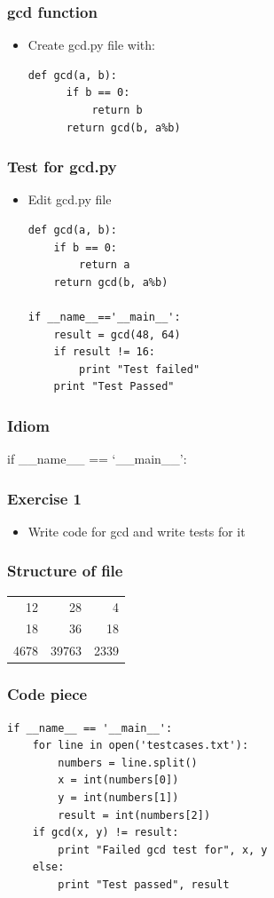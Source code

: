 \documentclass[presentation]{beamer}
\begin{document}
\begin{frame}[fragile]
\frametitle{gcd function}
\label{sec-4}


\begin{itemize}
\item Create gcd.py file with:
\lstset{language=Python}
\begin{lstlisting}
def gcd(a, b):
      if b == 0: 
          return b
      return gcd(b, a%b)
\end{lstlisting}
\end{itemize}
\end{frame}
\begin{frame}[fragile]
\frametitle{Test for gcd.py}
\label{sec-5}


\begin{itemize}
\item Edit gcd.py file
\lstset{language=Python}
\begin{lstlisting}
def gcd(a, b):
    if b == 0:
        return a
    return gcd(b, a%b)

if __name__=='__main__':
    result = gcd(48, 64)
    if result != 16:
        print "Test failed"
    print "Test Passed"
\end{lstlisting}
\end{itemize}
\end{frame}
\begin{frame}
\frametitle{Idiom}
\label{sec-6}

if \_\_name\_\_ == `\_\_main\_\_':
\end{frame}
\begin{frame}
\frametitle{Exercise 1}
\label{sec-7}


\begin{itemize}
\item Write code for gcd and write tests for it
\end{itemize}
\end{frame}
\begin{frame}
\frametitle{Structure of file}
\label{sec-8}


\begin{center}
\begin{tabular}{rrr}
   12  &     28  &     4  \\
   18  &     36  &    18  \\
 4678  &  39763  &  2339  \\
\end{tabular}
\end{center}
\end{frame}
\begin{frame}[fragile]
\frametitle{Code piece}
\label{sec-9}

\lstset{language=Python}
\begin{lstlisting}
if __name__ == '__main__':
    for line in open('testcases.txt'):
        numbers = line.split()
        x = int(numbers[0])
        y = int(numbers[1])
        result = int(numbers[2])
    if gcd(x, y) != result:
        print "Failed gcd test for", x, y
    else:
        print "Test passed", result
\end{lstlisting}
\end{frame}
\end{document}
